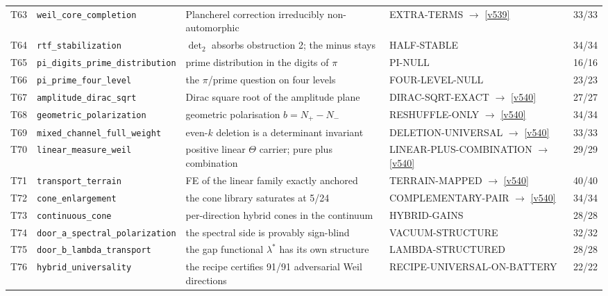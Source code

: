 \documentclass[11pt,a4paper]{article}
\begin{document}
{\begin{xltabular}{\linewidth}{@{}p{0.95cm} >{\raggedright\arraybackslash}p{3.1cm} Y >{\raggedright\scriptsize\arraybackslash}p{3.35cm} p{1.15cm}@{}}
T63 & \texttt{\scriptsize weil\_\allowbreak core\_\allowbreak completion} & Plancherel correction irreducibly non-automorphic & EXTRA-TERMS $\to$ \vref{v539} & 33/33\\
T64 & \texttt{\scriptsize rtf\_\allowbreak stabilization} & $\det_2$ absorbs obstruction 2; the minus stays & HALF-STABLE & 34/34\\
T65 & \texttt{\scriptsize pi\_\allowbreak digits\_\allowbreak prime\_\allowbreak distribution} & prime distribution in the digits of $\pi$ & PI-NULL & 16/16\\
T66 & \texttt{\scriptsize pi\_\allowbreak prime\_\allowbreak four\_\allowbreak level} & the $\pi$/prime question on four levels & FOUR-LEVEL-NULL & 23/23\\
T67 & \texttt{\scriptsize amplitude\_\allowbreak dirac\_\allowbreak sqrt} & Dirac square root of the amplitude plane & DIRAC-SQRT-EXACT $\to$ \vref{v540} & 27/27\\
T68 & \texttt{\scriptsize geometric\_\allowbreak polarization} & geometric polarisation $b=N_+-N_-$ & RESHUFFLE-ONLY $\to$ \vref{v540} & 34/34\\
T69 & \texttt{\scriptsize mixed\_\allowbreak channel\_\allowbreak full\_\allowbreak weight} & even-$k$ deletion is a determinant invariant & DELETION-UNIVERSAL $\to$ \vref{v540} & 33/33\\
T70 & \texttt{\scriptsize linear\_\allowbreak measure\_\allowbreak weil} & positive linear $\Theta$ carrier; pure plus combination & LINEAR-PLUS-COMBINATION $\to$ \vref{v540} & 29/29\\
T71 & \texttt{\scriptsize transport\_\allowbreak terrain} & FE of the linear family exactly anchored & TERRAIN-MAPPED $\to$ \vref{v540} & 40/40\\
T72 & \texttt{\scriptsize cone\_\allowbreak enlargement} & the cone library saturates at 5/24 & COMPLEMENTARY-PAIR $\to$ \vref{v540} & 34/34\\
T73 & \texttt{\scriptsize continuous\_\allowbreak cone} & per-direction hybrid cones in the continuum & HYBRID-GAINS & 28/28\\
T74 & \texttt{\scriptsize door\_\allowbreak a\_\allowbreak spectral\_\allowbreak polarization} & the spectral side is provably sign-blind & VACUUM-STRUCTURE & 32/32\\
T75 & \texttt{\scriptsize door\_\allowbreak b\_\allowbreak lambda\_\allowbreak transport} & the gap functional $\lambda^*$ has its own structure & LAMBDA-STRUCTURED & 28/28\\
T76 & \texttt{\scriptsize hybrid\_\allowbreak universality} & the recipe certifies 91/91 adversarial Weil directions & RECIPE-UNIVERSAL-ON-BATTERY & 22/22\\

\end{xltabular}}
\end{document}
